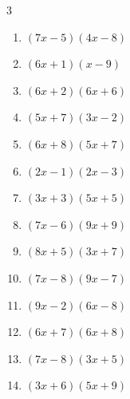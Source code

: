 \begin{multicols}{3}
\begin{enumerate}

  \item $(7x-5)(4x-8)$


  \item $(6x+1)(x-9)$


  \item $(6x+2)(6x+6)$


  \item $(5x+7)(3x-2)$


  \item $(6x+8)(5x+7)$


  \item $(2x-1)(2x-3)$


  \item $(3x+3)(5x+5)$


  \item $(7x-6)(9x+9)$


  \item $(8x+5)(3x+7)$


  \item $(7x-8)(9x-7)$


  \item $(9x-2)(6x-8)$


\columnbreak %

  \item $(6x+7)(6x+8)$


  \item $(7x-8)(3x+5)$


  \item $(3x+6)(5x+9)$



\end{enumerate}
\end{multicols}
